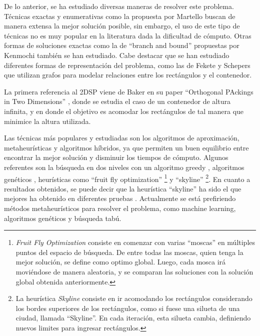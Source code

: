 \documentclass[letter, 10pt]{article}
\begin{document}
De lo anterior, se ha estudiado diversas maneras de resolver este problema. Técnicas exactas y enumerativas como la propuesta por Martello \cite{martello2003exact} buscan de manera extensa la mejor solución posible, sin embargo, el uso de este tipo de técnicas no es muy popular en la literatura dada la dificultad de cómputo. Otras formas de soluciones exactas como la de ``branch and bound'' propuestas por Kenmochi \cite{kenmochi2009branch} también se han estudiado. Cabe destacar que se han estudiado diferentes formas de representación del problema, como las de Fekete y Schepers \cite{fekete1997more} que utilizan grafos para modelar relaciones entre los rectángulos y el contenedor.

La primera referencia al 2DSP viene de Baker en su paper ``Orthogonal PAckings in Two Dimensions'' \cite{baker1980orthogonal}, donde se estudia el caso de un contenedor de altura infinita, y en donde el objetivo es acomodar los rectángulos de tal manera que minimice la altura utilizada.

Las técnicas más populares y estudiadas son los algoritmos de aproximación, metaheurísticas y algoritmos híbridos, ya que permiten un buen equilibrio entre encontrar la mejor solución y disminuir los tiempos de cómputo. Algunos referentes son la búsqueda en dos niveles con un algoritmo greedy \cite{chen2007twolevel}, algoritmos genéticos \cite{thomas2013hybrid} \cite{hopper2001empirical}, heurísticas como ``fruit fly optimization'' \cite{babaoglu2017fruit} \footnote{\textit{Fruit Fly Optimization} consiste en comenzar con varias ``moscas'' en múltiples puntos del espacio de búsqueda. De entre todas las moscas, quien tenga la mejor solución, se define como optimo global. Luego, cada mosca irá moviéndose de manera aleatoria, y se comparan las soluciones con la solución global obtenida anteriormente.} y ``skyline'' \cite{wei2011skyline} \footnote{La heurística \textit{Skyline} consiste en ir acomodando los rectángulos considerando los bordes superiores de los rectángulos, como si fuese una silueta de una ciudad, llamada ``Skyline''. En cada iteración, esta silueta cambia, definiendo nuevos limites para ingresar rectángulos.}. En cuanto a resultados obtenidos, se puede decir que la heurística ``skyline'' ha sido el que mejores ha obtenido en diferentes pruebas \cite{wei2011skyline}. Actualmente se está prefiriendo métodos metaheurísticos para resolver el problema, como machine learning, algoritmos genéticos y búsqueda tabú.
\end{document}

